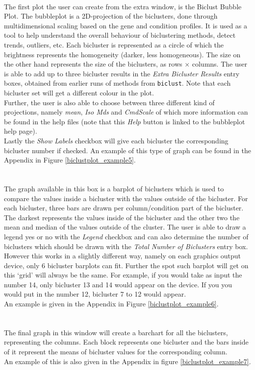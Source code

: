 \documentclass[a4paper]{article}\usepackage[]{graphicx}\usepackage[]{color}
\begin{document}
\\
\noindent The first plot the user can create from the extra window, is the
Biclust Bubble Plot. The bubbleplot is a 2D-projection of the biclusters, done
through multidimensional scaling based on the gene and condition profiles. It is
used as a tool to help understand the overall behaviour of biclustering methods, detect trends, outliers, etc. Each
bicluster is represented as a circle of which the brightness represents the
homogeneity (darker, less homogeneous). The size on the other hand represents
the size of the biclusters, as rows $\times$ columns. The user is able to add up
to three bicluster results in the {\it Extra Bicluster Results} entry boxes,
obtained from earlier runs of methods from \verb|biclust|. Note that each bicluster set
will get a different colour in the plot.\\
Further, the user is also able to choose between three different kind of
projections, namely {\it mean}, {\it Iso Mds} and {\it CmdScale} of which more
information can be found in the help files (note that this {\it Help} button is
linked to the bubbleplot help page). \\
Lastly the {\it Show Labels} checkbox will give each bicluster the corresponding
bicluster number if checked. An example of this type of graph can be found in
the Appendix in Figure \ref{biclustplot_example5}.
\\ \\
\\
\noindent The graph available in this box is a barplot of biclusters which is
used to compare the values inside a bicluster with the values outside of the
bicluster. For each bicluster, three bars are drawn per column/condition part of
the bicluster. The darkest represents the values inside of the bicluster and the
other two the mean and median of the values outside of the cluster. The user is
able to draw a legend yes or no with the {\it Legend} checkbox and can also
determine the number of biclusters which should be drawn with the {\it Total
Number of Biclusters} entry box. However this works in a slightly different way,
namely on each graphics output device, only 6 bicluster barplots can fit.
Further the spot such barplot will get on this `grid' will always be the same.
For example, if you would take as input the number 14, only bicluster 13 and
14 would appear on the device. If you you would put in the number 12, bicluster
7 to 12 would appear.\\
An example is given in the Appendix in Figure \ref{biclustplot_example6}.
\\ \\
\\
\noindent The final graph in this window will create a barchart for all the
biclusters, representing the columns. Each block represents one bicluster and
the bars inside of it represent the means of bicluster values for the corresponding
column.\\
An example of this is also given in the Appendix in figure
\ref{biclustplot_example7}.
\end{document}

